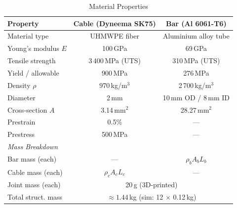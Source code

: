\begin{table}[htbp]
\centering
\caption{Material Properties}
\label{tab:materials}
\begin{tabular}{l c c}
\hline
\textbf{Property} & \textbf{Cable (Dyneema SK75)} & \textbf{Bar (Al 6061-T6)} \\
\hline
Material type       & UHMWPE fiber            & Aluminium alloy tube \\
Young's modulus $E$ & 100\,GPa                & 69\,GPa \\
Tensile strength    & 3\,400\,MPa (UTS)       & 310\,MPa (UTS) \\
Yield / allowable   & 900\,MPa                & 276\,MPa \\
Density $\rho$      & 970\,kg/m$^3$           & 2\,700\,kg/m$^3$ \\
Diameter            & 2\,mm                   & 10\,mm OD / 8\,mm ID \\
Cross-section $A$   & 3.14\,mm$^2$            & 28.27\,mm$^2$ \\
Prestrain           & 0.5\%                   & --- \\
Prestress           & 500\,MPa                & --- \\
\hline
\multicolumn{3}{l}{\textit{Mass Breakdown}} \\
\hline
Bar mass (each)     & ---                     & $\rho_b A_b L_b$ \\
Cable mass (each)   & $\rho_c A_c L_c$        & --- \\
Joint mass (each)   & \multicolumn{2}{c}{20\,g (3D-printed)} \\
Total struct. mass  & \multicolumn{2}{c}{$\approx 1.44$\,kg (sim: 12 $\times$ 0.12\,kg)} \\
\hline
\end{tabular}
\end{table}



